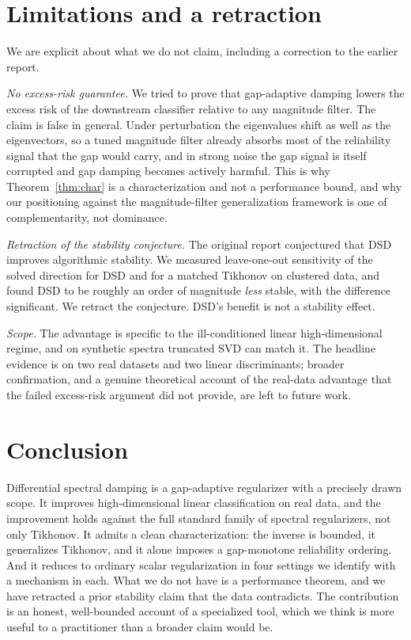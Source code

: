 \documentclass[preprint,12pt]{elsarticle}
\begin{document}
\section{Limitations and a retraction}
\label{sec:limitations}

We are explicit about what we do not claim, including a correction to the earlier report.

\emph{No excess-risk guarantee.} We tried to prove that gap-adaptive damping lowers the excess risk of
the downstream classifier relative to any magnitude filter. The claim is false in general. Under
perturbation the eigenvalues shift as well as the eigenvectors, so a tuned magnitude filter already
absorbs most of the reliability signal that the gap would carry, and in strong noise the gap signal is
itself corrupted and gap damping becomes actively harmful. This is why Theorem~\ref{thm:char} is a
characterization and not a performance bound, and why our positioning against the magnitude-filter
generalization framework \cite{velikanov2024spectral} is one of complementarity, not dominance.

\emph{Retraction of the stability conjecture.} The original report conjectured that DSD improves
algorithmic stability. We measured leave-one-out sensitivity of the solved direction for DSD and for a
matched Tikhonov on clustered data, and found DSD to be roughly an order of magnitude \emph{less}
stable, with the difference significant. We retract the conjecture. DSD's benefit is not a stability
effect.

\emph{Scope.} The advantage is specific to the ill-conditioned linear high-dimensional regime, and on
synthetic spectra truncated SVD can match it. The headline evidence is on two real datasets and two
linear discriminants; broader confirmation, and a genuine theoretical account of the real-data
advantage that the failed excess-risk argument did not provide, are left to future work.

\section{Conclusion}
\label{sec:conclusion}

Differential spectral damping is a gap-adaptive regularizer with a precisely drawn scope. It improves
high-dimensional linear classification on real data, and the improvement holds against the full
standard family of spectral regularizers, not only Tikhonov. It admits a clean characterization: the
inverse is bounded, it generalizes Tikhonov, and it alone imposes a gap-monotone reliability ordering.
And it reduces to ordinary scalar regularization in four settings we identify with a mechanism in each.
What we do not have is a performance theorem, and we have retracted a prior stability claim that the
data contradicts. The contribution is an honest, well-bounded account of a specialized tool, which we
think is more useful to a practitioner than a broader claim would be.
\end{document}

